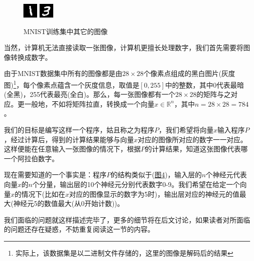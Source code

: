 \documentclass[titlepage,UTF8,zihao=-4]{ctexart}
\begin{document}
\begin{figure}[htbp]
    \includegraphics[width=4 cm]{./Images/6.png}
    \includegraphics[width=4 cm]{./Images/7.png}
    \caption{MNIST训练集中其它的图像}\label{im3}
\end{figure}

当然，计算机无法直接读取一张图像，计算机更擅长处理数字，我们首先需要将图像转换成数字。

由于MNIST数据集中所有的图像都是由$28\times28$个像素点组成的黑白图片(灰度图)\footnote{实际上，该数据集是以二进制文件存储的，这里的图像是解码后的结果}，每个像素点蕴含一个灰度信息，取值是$[0,255]$中的整数，其中0代表最暗(全黑)，255代表最亮(全白)。那么，每一张图像都有一个$28\times28$的矩阵与之对应。更一般地，不如将矩阵拉直，转换成一个向量$x\in \mathbb{R}^{n}$，其中$n=28 \times 28=784$。

我们的目标是编写这样一个程序，姑且称之为程序$P$，我们希望将向量$x$输入程序$P$，经过计算后，得到的计算结果能够与向量$x$对应的图像所对应的数字一一对应。这样便能在任意输入一张图像的情况下，根据$P$的计算结果，知道这张图像代表哪一个阿拉伯数字。

现在需要知道的一个事实是：程序$P$的结构类似于(\hyperref[im4]{图4})，输入层的$n$个神经元代表向量$x$的$n$个分量，输出层的10个神经元分别代表数字0-9。我们希望在给定一个向量$x$的情况下(比如在$x$对应的图像显示的数字为5时)，输出层对应的神经元的值最大(神经元5的数值最大(从0开始计数))。

我们面临的问题就这样描述完毕了，更多的细节将在后文讨论，如果读者对所面临的问题还存在疑惑，不妨重复阅读这一节的内容。
\end{document}
